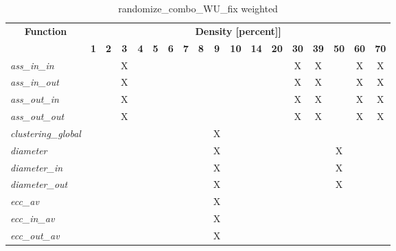 \begin{table}[h] \centering \begin{tabular}{|l|c|c|c|c|c|c|c|c|c|c|c|c|c|c|c|c|c|} \hline\multicolumn{1}{|c|}{\textbf{\large{Function}}} & \multicolumn{17}{c|}{\large{\textbf{Density [percent]]}}}\\\cline{2-18}  & \textbf{1} &  \textbf{2} &  \textbf{3} &  \textbf{4} &  \textbf{5} &  \textbf{6} &  \textbf{7} &  \textbf{8} &  \textbf{9} &  \textbf{10} &  \textbf{14} &  \textbf{20} &  \textbf{30} &  \textbf{39} &  \textbf{50} &  \textbf{60} &  \textbf{70} \\ \hline   \textit{ass\_in\_in} &   &   & X &   &   &   &   &   &   &   &   &   & X & X &   & X & X \\ \hline  \textit{ass\_in\_out} &   &   & X &   &   &   &   &   &   &   &   &   & X & X &   & X & X \\ \hline  \textit{ass\_out\_in} &   &   & X &   &   &   &   &   &   &   &   &   & X & X &   & X & X \\ \hline  \textit{ass\_out\_out} &   &   & X &   &   &   &   &   &   &   &   &   & X & X &   & X & X \\ \hline  \textit{clustering\_global} &   &   &   &   &   &   &   &   & X &   &   &   &   &   &   &   &   \\ \hline  \textit{diameter} &   &   &   &   &   &   &   &   & X &   &   &   &   &   & X &   &   \\ \hline  \textit{diameter\_in} &   &   &   &   &   &   &   &   & X &   &   &   &   &   & X &   &   \\ \hline  \textit{diameter\_out} &   &   &   &   &   &   &   &   & X &   &   &   &   &   & X &   &   \\ \hline  \textit{ecc\_av} &   &   &   &   &   &   &   &   & X &   &   &   &   &   &   &   &   \\ \hline  \textit{ecc\_in\_av} &   &   &   &   &   &   &   &   & X &   &   &   &   &   &   &   &   \\ \hline  \textit{ecc\_out\_av} &   &   &   &   &   &   &   &   & X &   &   &   &   &   &   &   &   \\ \hline \end{tabular}\caption{randomize\_combo\_WU\_fix weighted}\label{tab:my_label} \end{table}